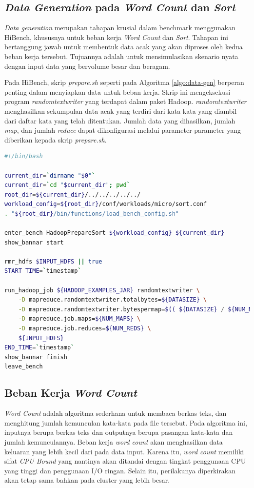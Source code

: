 \subsection{\textit{Data Generation} pada \textit{Word Count} dan \textit{Sort}}
\textit{Data generation} merupakan tahapan krusial dalam benchmark menggunakan HiBench, khususnya untuk beban kerja \textit{Word Count} dan \textit{Sort}. Tahapan ini bertanggung jawab untuk membentuk data acak yang akan diproses oleh kedua beban kerja tersebut. Tujuannya adalah untuk mensimulasikan skenario nyata dengan input data yang bervolume besar dan beragam.

Pada HiBench, skrip \textit{prepare.sh} seperti pada Algoritma \ref{algo:data-gen} berperan penting dalam menyiapkan data untuk beban kerja. Skrip ini mengeksekusi program \textit{randomtextwriter} yang terdapat dalam paket Hadoop. \textit{randomtextwriter} menghasilkan sekumpulan data acak yang terdiri dari kata-kata yang diambil dari daftar kata yang telah ditentukan. Jumlah data yang dihasilkan, jumlah \textit{map}, dan jumlah \textit{reduce} dapat dikonfigurasi melalui parameter-parameter yang diberikan kepada skrip \textit{prepare.sh}.

\begin{lstlisting}[language=bash, caption=Skrip yang Digunakan HiBench pada Tahap \textit{Data Generation}, label=algo:data-gen]
#!/bin/bash

current_dir=`dirname "$0"`
current_dir=`cd "$current_dir"; pwd`
root_dir=${current_dir}/../../../../../
workload_config=${root_dir}/conf/workloads/micro/sort.conf
. "${root_dir}/bin/functions/load_bench_config.sh"

enter_bench HadoopPrepareSort ${workload_config} ${current_dir}
show_bannar start

rmr_hdfs $INPUT_HDFS || true
START_TIME=`timestamp`

run_hadoop_job ${HADOOP_EXAMPLES_JAR} randomtextwriter \
    -D mapreduce.randomtextwriter.totalbytes=${DATASIZE} \
    -D mapreduce.randomtextwriter.bytespermap=$(( ${DATASIZE} / ${NUM_MAPS} )) \
    -D mapreduce.job.maps=${NUM_MAPS} \
    -D mapreduce.job.reduces=${NUM_REDS} \
    ${INPUT_HDFS}
END_TIME=`timestamp`
show_bannar finish
leave_bench
\end{lstlisting}

\subsection{Beban Kerja \textit{Word Count}}
\textit{Word Count} adalah algoritma sederhana untuk membaca berkas teks, dan menghitung jumlah kemunculan kata-kata pada file tersebut. Pada algoritma ini, inputnya berupa berkas teks dan outputnya berupa pasangan kata-kata dan jumlah kemunculannya. Beban kerja \textit{word count} akan menghasilkan data keluaran yang lebih kecil dari pada data input. %
Karena itu, \textit{word count} memiliki sifat \textit{CPU Bound} yang nantinya akan ditandai dengan tingkat penggunaan CPU yang tinggi dan penggunaan I/O ringan. Selain itu, perilakunya diperkirakan akan tetap sama bahkan pada cluster yang lebih besar.

